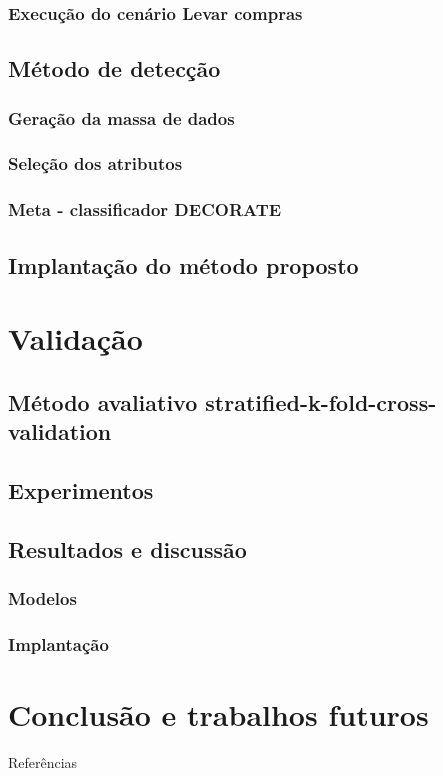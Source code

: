 \documentclass[brazil]{beamer}
\begin{document}
\subsubsection{Execução do cenário Levar compras}
\subsection{Método de detecção}
\subsubsection{Geração da massa de dados}
\subsubsection{Seleção dos atributos}
\subsubsection{Meta - classificador DECORATE}
\subsection{Implantação do método proposto}

\section{Validação}
\subsection{Método avaliativo stratified-k-fold-cross-validation}
\subsection{Experimentos}
\subsection{Resultados e discussão}
\subsubsection{Modelos}
\subsubsection{Implantação}
\section{Conclusão e trabalhos futuros}


\begin{frame}[allowframebreaks]{Referências}
  
\end{frame}
\end{document}
